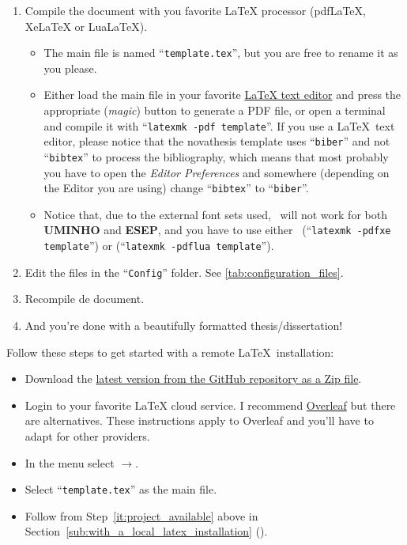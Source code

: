 \begin{enumerate}
  \item Compile the document with you favorite LaTeX processor (pdfLaTeX, XeLaTeX or LuaLaTeX).
  \begin{itemize}
    \item The main file is named “\verb!template.tex!”, but you are free to rename it as you please.
    \item Either load the main file in your favorite \href{https://en.wikipedia.org/wiki/Comparison_of_TeX_editors}{LaTeX text editor} and press the appropriate (\emph{magic}) button to generate a PDF file, or open a terminal and compile it with “\verb!latexmk -pdf template!”. If you use a \LaTeX\ text editor, please notice that the \gls{novathesis} template uses “\verb!biber!” and not “\verb!bibtex!” to process the bibliography, which means that most probably you have to open the \emph{Editor Preferences} and somewhere (depending on the Editor you are using) change “\verb!bibtex!” to “\verb!biber!”.
    \item Notice that, due to the external font sets used, \pdfLaTeX\ will not work for both \textbf{UMINHO} and \textbf{ESEP}, and you have to use either \XeLaTeX\ (“\verb!latexmk -pdfxe template!”) or \LuaLaTeX (“\verb!latexmk -pdflua template!”).
  \end{itemize}
  \item Edit the files in the “\texttt{Config}” folder.  See \autoref{tab:configuration_files}.
  \item Recompile de document.
  \item And you're done with a beautifully formatted thesis/dissertation! {\setlength{\twemojiDefaultHeight}{1.5\twemojiDefaultHeight}\emojiSmile}
\end{enumerate}




Follow these steps to get started with a remote \LaTeX\ installation:

\begin{itemize}
  \item Download the \href{https://github.com/joaomlourenco/novathesis/archive/main.zip}{latest version from the GitHub repository as a Zip file}.
  \item Login to your favorite LaTeX cloud service. I recommend \href{https://www.overleaf.com/?r=f5160636&rm=d&rs=b}{Overleaf} but there are alternatives. These instructions apply to Overleaf and you'll have to adapt for other providers.
  \item In the menu select $\rightarrow$.
  \item Select “\verb!template.tex!” as the main file.
  \item Follow from Step~\ref{it:project_available} above in Section~\ref{sub:with_a_local_latex_installation} ().
\end{itemize}
\fi

